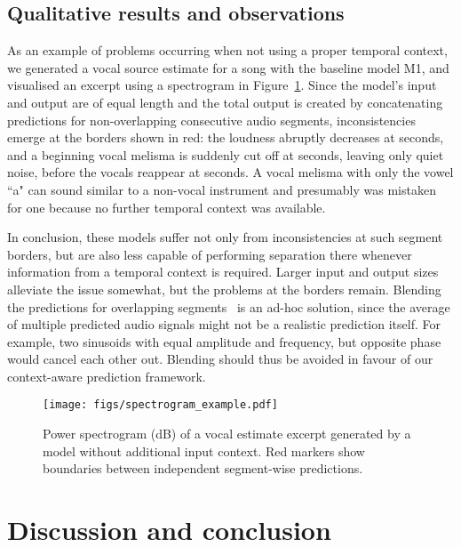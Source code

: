 \documentclass{article}
\begin{document}
\subsection{Qualitative results and observations}
\label{sec:results_qualitative}

As an example of problems occurring when not using a proper temporal context, we generated a vocal source estimate for a song with the baseline model M1, and visualised an excerpt using a spectrogram in Figure~\ref{fig:spectrogram}.
Since the model's input and output are of equal length and the total output is created by concatenating predictions for non-overlapping consecutive audio segments, inconsistencies emerge at the borders shown in red: the loudness abruptly decreases at  seconds, and a beginning vocal melisma is suddenly cut off at  seconds, leaving only quiet noise, before the vocals reappear at  seconds. A vocal melisma with only the vowel ``a" can sound similar to a non-vocal instrument and presumably was mistaken for one because no further temporal context was available.

In conclusion, these models suffer not only from inconsistencies at such segment borders, but are also less capable of performing separation there whenever information from a temporal context is required.
Larger input and output sizes alleviate the issue somewhat, but the problems at the borders remain. 
Blending the predictions for overlapping segments~\cite{Grais2018} is an ad-hoc solution, since the average of multiple predicted audio signals might not be a realistic prediction itself. For example, two sinusoids with equal amplitude and frequency, but opposite phase would cancel each other out.
Blending should thus be avoided in favour of our context-aware prediction framework.

\begin{figure}[t]
\vspace{-0.2cm}
\centering
\centerline{\texttt{[image: figs/spectrogram\_example.pdf]}}
\vspace{-0.3cm}
\caption{Power spectrogram (dB) of a vocal estimate excerpt generated by a model without additional input context. Red markers show boundaries between independent segment-wise predictions.}
\label{fig:spectrogram}
\end{figure}

\section{Discussion and conclusion}
\label{sec:conclusion}
\end{document}
